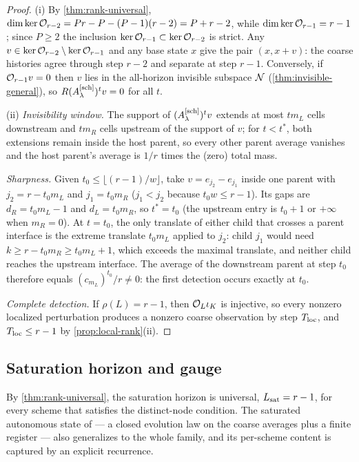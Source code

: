 \documentclass[pdflatex,sn-mathphys-num]{sn-jnl}%
\theoremstyle{thmstyleone}%
\theoremstyle{thmstyletwo}%
\theoremstyle{thmstylethree}%
\newcommand{\OL}{{\cal O}_L}
\newcommand{\Asch}{A^{[\rm sch]}_\lambda}
\begin{document}
\begin{proof}
(i)  By \cref{thm:rank-universal}, $\dim\ker{\cal O}_{r-2}=Pr-P-(P-1)(r-2)=P+r-2$, while $\dim\ker{\cal O}_{r-1}=r-1$; since $P\ge2$ the inclusion $\ker{\cal O}_{r-1}\subset\ker{\cal O}_{r-2}$ is strict.
Any $v\in\ker{\cal O}_{r-2}\setminus\ker{\cal O}_{r-1}$ and any base state $x$ give the pair $(x,x+v)$: the coarse histories agree through step $r-2$ and separate at step $r-1$.
Conversely, if ${\cal O}_{r-1}v=0$ then $v$ lies in the all-horizon invisible subspace ${\cal N}$ (\cref{thm:invisible-general}), so $R(\Asch)^tv=0$ for all $t$.

(ii)  \emph{Invisibility window.}
The support of $(\Asch)^tv$ extends at most $tm_L$ cells downstream and $tm_R$ cells upstream of the support of $v$; for $t<t^\ast$, both extensions remain inside the host parent, so every other parent average vanishes and the host parent's average is $1/r$ times the (zero) total mass.

\emph{Sharpness.}
Given $t_0\le\lfloor(r-1)/w\rfloor$, take $v=e_{j_2}-e_{j_1}$ inside one parent with $j_2=r-t_0m_L$ and $j_1=t_0m_R$ ($j_1<j_2$ because $t_0w\le r-1$).
Its gaps are $d_R=t_0m_L-1$ and $d_L=t_0m_R$, so $t^\ast=t_0$ (the upstream entry is $t_0+1$ or $+\infty$ when $m_R=0$).
At $t=t_0$, the only translate of either child that crosses a parent interface is the extreme translate $t_0m_L$ applied to $j_2$: child $j_1$ would need $k\ge r-t_0m_R\ge t_0m_L+1$, which exceeds the maximal translate, and neither child reaches the upstream interface.
The average of the downstream parent at step $t_0$ therefore equals $(c_{m_L})^{t_0}/r\ne0$: the first detection occurs exactly at $t_0$.

\emph{Complete detection.}
If $\rho(L)=r-1$, then $\OL\iota_K$ is injective, so every nonzero localized perturbation produces a nonzero coarse observation by step $T_{\rm loc}$, and $T_{\rm loc}\le r-1$ by \cref{prop:local-rank}(ii).
\end{proof}

\subsection{Saturation horizon and gauge}\label{sec:gauge}

By \cref{thm:rank-universal}, the saturation horizon is universal, $L_{\rm sat}=r-1$, for every scheme that satisfies the distinct-node condition.
The saturated autonomous state of \cite{PolemitisChristakisDrikakis2026FVerasure} --- a closed evolution law on the coarse averages plus a finite register --- also generalizes to the whole family, and its per-scheme content is captured by an explicit recurrence.
\end{document}
